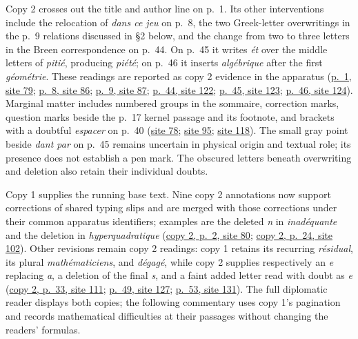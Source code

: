 Copy 2 crosses out the title and author line on p.~1. Its other interventions
include the relocation of \textit{dans ce jeu} on p.~8, the two Greek-letter
overwritings in the p.~9 relations discussed in \S2 below, and the change from
two to three letters in the Breen correspondence on p.~44. On p.~45 it writes
\textit{ét} over the middle letters of \textit{pitié}, producing \textit{piété};
on p.~46 it inserts \textit{algébrique} after the first \textit{géométrie}.
These readings are reported as copy 2 evidence in the apparatus
(\href{https://grothendieck.umontpellier.fr/web/viewer.html?file=../119.pdf\#page=80}{p.~1, site 79};
\href{https://grothendieck.umontpellier.fr/web/viewer.html?file=../119.pdf\#page=87}{p.~8, site 86};
\href{https://grothendieck.umontpellier.fr/web/viewer.html?file=../119.pdf\#page=88}{p.~9, site 87};
\href{https://grothendieck.umontpellier.fr/web/viewer.html?file=../119.pdf\#page=123}{p.~44, site 122};
\href{https://grothendieck.umontpellier.fr/web/viewer.html?file=../119.pdf\#page=124}{p.~45, site 123};
\href{https://grothendieck.umontpellier.fr/web/viewer.html?file=../119.pdf\#page=125}{p.~46, site 124}).
Marginal matter includes numbered groups in the sommaire, correction marks,
question marks beside the p.~17 kernel passage and its footnote, and brackets
with a doubtful \textit{espacer} on p.~40
(\href{https://grothendieck.umontpellier.fr/web/viewer.html?file=../119.pdf\#page=79}{site 78};
\href{https://grothendieck.umontpellier.fr/web/viewer.html?file=../119.pdf\#page=96}{site 95};
\href{https://grothendieck.umontpellier.fr/web/viewer.html?file=../119.pdf\#page=119}{site 118}).
The small gray point beside \textit{dant par} on p.~45 remains uncertain in
physical origin and textual role; its presence does not establish a pen mark.
The obscured letters beneath overwriting and deletion also retain their
individual doubts.

Copy 1 supplies the running base text. Nine copy 2 annotations now support
corrections of shared typing slips and are merged with those corrections under
their common apparatus identifiers; examples are the deleted \textit{n} in
\textit{inadéquante} and the deletion in \textit{hyperquadratique}
(\href{https://grothendieck.umontpellier.fr/web/viewer.html?file=../119.pdf\#page=81}{copy 2, p.~2, site 80};
\href{https://grothendieck.umontpellier.fr/web/viewer.html?file=../119.pdf\#page=103}{copy 2, p.~24, site 102}).
Other revisions remain copy 2 readings: copy 1 retains its recurring
\textit{résidual}, its plural \textit{mathématiciens}, and
\textit{dégagé}, while copy 2 supplies respectively an \textit{e} replacing
\textit{a}, a deletion of the final \textit{s}, and a faint added letter read
with doubt as \textit{e}
(\href{https://grothendieck.umontpellier.fr/web/viewer.html?file=../119.pdf\#page=112}{copy 2, p.~33, site 111};
\href{https://grothendieck.umontpellier.fr/web/viewer.html?file=../119.pdf\#page=128}{p.~49, site 127};
\href{https://grothendieck.umontpellier.fr/web/viewer.html?file=../119.pdf\#page=132}{p.~53, site 131}).
The full diplomatic reader displays both copies; the following commentary
uses copy 1's pagination and records mathematical difficulties at their
passages without changing the readers' formulas.
